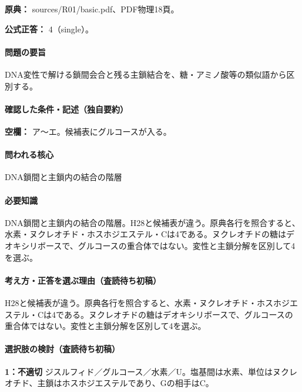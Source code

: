 \noindent\textbf{原典：} sources/R01/basic.pdf、PDF物理18頁。

\textbf{公式正答：} 4（single）。

\paragraph{問題の要旨} DNA変性で解ける鎖間会合と残る主鎖結合を、糖・アミノ酸等の類似語から区別する。

\paragraph{確認した条件・記述（独自要約）}\mbox{}\par

\noindent\textbf{空欄：} ア〜エ。候補表にグルコースが入る。\par

\paragraph{問われる核心} DNA鎖間と主鎖内の結合の階層

\paragraph{必要知識} DNA鎖間と主鎖内の結合の階層。H28と候補表が違う。原典各行を照合すると、水素・ヌクレオチド・ホスホジエステル・Cは4である。ヌクレオチドの糖はデオキシリボースで、グルコースの重合体ではない。変性と主鎖分解を区別して4を選ぶ。

\paragraph{考え方・正答を選ぶ理由（査読待ち初稿）} H28と候補表が違う。原典各行を照合すると、水素・ヌクレオチド・ホスホジエステル・Cは4である。ヌクレオチドの糖はデオキシリボースで、グルコースの重合体ではない。変性と主鎖分解を区別して4を選ぶ。

\paragraph{選択肢の検討（査読待ち初稿）}\mbox{}\par

\noindent\textbf{1：不適切} ジスルフィド／グルコース／水素／U。塩基間は水素、単位はヌクレオチド、主鎖はホスホジエステルであり、Gの相手はC。\par

